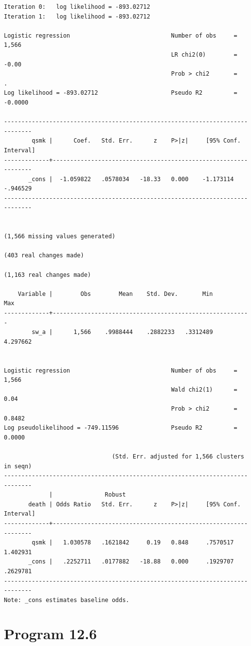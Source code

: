 \documentclass[
  10pt,
]{book}
\begin{document}
\begin{verbatim}
Iteration 0:   log likelihood = -893.02712  
Iteration 1:   log likelihood = -893.02712  

Logistic regression                             Number of obs     =      1,566
                                                LR chi2(0)        =      -0.00
                                                Prob > chi2       =          .
Log likelihood = -893.02712                     Pseudo R2         =    -0.0000

------------------------------------------------------------------------------
        qsmk |      Coef.   Std. Err.      z    P>|z|     [95% Conf. Interval]
-------------+----------------------------------------------------------------
       _cons |  -1.059822   .0578034   -18.33   0.000    -1.173114    -.946529
------------------------------------------------------------------------------


(1,566 missing values generated)

(403 real changes made)

(1,163 real changes made)

    Variable |        Obs        Mean    Std. Dev.       Min        Max
-------------+---------------------------------------------------------
        sw_a |      1,566    .9988444    .2882233   .3312489   4.297662


Logistic regression                             Number of obs     =      1,566
                                                Wald chi2(1)      =       0.04
                                                Prob > chi2       =     0.8482
Log pseudolikelihood = -749.11596               Pseudo R2         =     0.0000

                               (Std. Err. adjusted for 1,566 clusters in seqn)
------------------------------------------------------------------------------
             |               Robust
       death | Odds Ratio   Std. Err.      z    P>|z|     [95% Conf. Interval]
-------------+----------------------------------------------------------------
        qsmk |   1.030578   .1621842     0.19   0.848     .7570517    1.402931
       _cons |   .2252711   .0177882   -18.88   0.000     .1929707    .2629781
------------------------------------------------------------------------------
Note: _cons estimates baseline odds.
\end{verbatim}

\hypertarget{program-12.6-1}{%
\section{Program 12.6}\label{program-12.6-1}}
\end{document}
